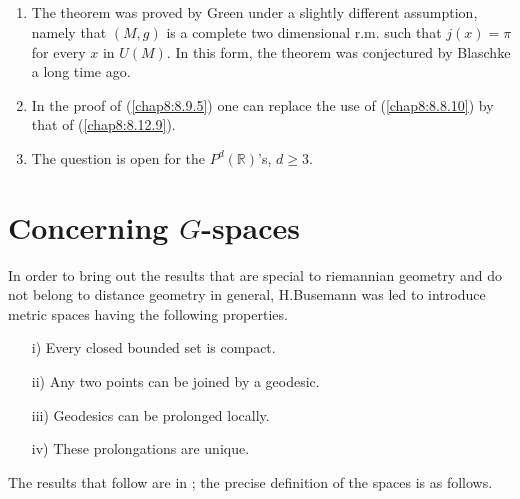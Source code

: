 \setcounter{subsection}{6}

\subsection{}\label{chap8:8.9.7}

\begin{remarks*}
\begin{enumerate}
\renewcommand{\labelenumi}{\theenumi)}
\item The theorem was proved by Green under a slightly different
  assumption, namely that $(M,g)$ is a complete two dimensional r.m.\@
  such that $j(x)=\pi$ for every $x$ in $U(M)$. In this form, the
  theorem was conjectured by Blaschke a long time ago.

\item In the proof of (\ref{chap8:8.9.5}) one can replace the use of
  (\ref{chap8:8.8.10}) by that of (\ref{chap8:8.12.9}).

\item The question is open for the $P^{d}(\mathbb{R})$'s, $d\geq 3$.
\end{enumerate}
\end{remarks*}

\section{Concerning $G$-spaces}\label{chap8:sec10}

In order to bring out the results that are special to riemannian
geometry and do not belong to distance geometry in general, H.Busemann
was led to introduce metric spaces having the following properties.
\begin{itemize}
\item[i)] Every closed bounded set is compact.

\item[ii)] Any two points can be joined by a geodesic.

\item[iii)] Geodesics can be prolonged locally.

\item[iv)] These prolongations are unique.
\end{itemize}

The results that follow are in \cite{7}; the precise definition of the
spaces is as follows.

